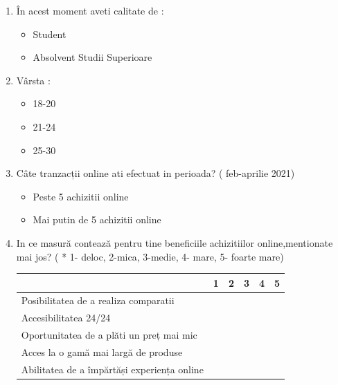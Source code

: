 \documentclass[a4paper, 12pt]{article}
\begin{document}
\begin{enumerate}
	\item În acest moment aveti calitate de :
\begin{itemize}
		\item Student
		\item Absolvent Studii Superioare
\end{itemize}
	 	\item Vârsta : 
\begin{itemize}
		\item 18-20
		\item 21-24
		\item 25-30
\end{itemize}		
	\item Câte tranzacții online ati efectuat in perioada? ( feb-aprilie 2021) 
	
	\begin{itemize}
		\item Peste 5 achizitii online
		\item Mai putin de 5 achizitii online
	\end{itemize}
	\item	In ce masură contează pentru tine beneficiile achizitiilor online,mentionate mai jos? ( * 1- deloc, 2-mica, 3-medie, 4- mare,  5- foarte mare)
\begin{center}
	\begin{tabular}{ | m{19em} | m{1cm}| m{1cm} | m{1cm}| m{1cm} | m{1cm} |} 
		\hline
		 & 1 & 2 & 3 & 4 & 5\\ 
		\hline
		Posibilitatea de a realiza comparatii  &  &  &  & & \\ 
		\hline
		Accesibilitatea 
		24/24  &  &   &  &  &\\ 
		\hline
		Oportunitatea de a plăti un preț mai mic &  &   &  & & \\ 
		\hline
		Acces la o gamă mai largă de produse &  &  &  & & \\ 
		\hline
		Abilitatea de a împărtăși experiența online &  &  &  & & \\
		\hline
	\end{tabular}
\newline
\end{center}


\end{enumerate}
\end{document}
